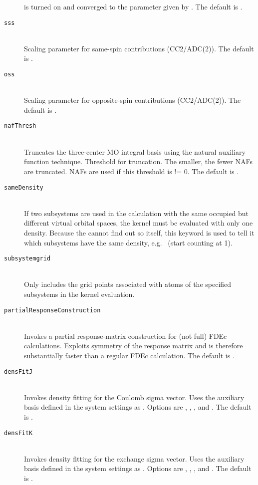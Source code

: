 \begin{description}
    is turned on and converged to the parameter given by . The default is .
    \item[\texttt{sss}]\hfill\\
    Scaling parameter for same-spin contributions (CC2/ADC(2)). The default is .
    \item[\texttt{oss}]\hfill\\
    Scaling parameter for opposite-spin contributions (CC2/ADC(2)). The default is .
    \item[\texttt{nafThresh}]\hfill\\
    Truncates the three-center MO integral basis using the natural auxiliary function technique.
    Threshold for truncation. The smaller, the fewer NAFs are truncated. NAFs are used if this 
    threshold is != 0. The default is .
    \item[\texttt{sameDensity}]\hfill\\
    If two subsystems are used in the calculation with the same occupied but different virtual orbital spaces,
    the kernel must be evaluated with only one density. Because the  cannot find out so itself,
    this keyword is used to tell it which subsystems have the same density, e.g.~ (start counting at 1).
    \item[\texttt{subsystemgrid}]\hfill\\
    Only includes the grid points associated with atoms of the specified subsystems in the kernel evaluation.
    \item[\texttt{partialResponseConstruction}]\hfill\\
    Invokes a partial response-matrix construction for (not full) FDEc calculations.
    Exploits symmetry of the response matrix and is therefore substantially faster than
    a regular FDEc calculation.
    The default is .
    \item[\texttt{densFitJ}]\hfill\\
    Invokes density fitting for the Coulomb sigma vector. Uses the auxiliary basis defined in the system settings as .
    Options are , , , and . The default is .
    \item[\texttt{densFitK}]\hfill\\
    Invokes density fitting for the exchange sigma vector. Uses the auxiliary basis defined in the system settings as .
    Options are , , , and . The default is .

\end{description}
